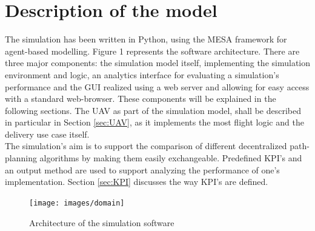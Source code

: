 \section{Description of the model}\label{sec:model}
The simulation has been written in Python, using the MESA \cite{masad.2015} framework for agent-based modelling. Figure 1 represents the software architecture. There are three major components: the simulation model itself, implementing the simulation environment and logic, an analytics interface for evaluating a simulation's performance and the GUI realized using a web server and allowing for easy access with a standard web-browser. These components will be explained in the following sections. The UAV as part of the simulation model, shall be described in particular in Section \ref{sec:UAV}, as it implements the most flight logic and the delivery use case itself.\\
The simulation's aim is to support the comparison of different decentralized path-planning algorithms by making them easily exchangeable. Predefined KPI's and an output method are used to support analyzing the performance of one's implementation. Section \ref{sec:KPI} discusses the way KPI's are defined.\\
\begin{figure}[tbp]\label{fig:architecture}
	\centering
	\texttt{[image: images/domain]} 
	\caption{Architecture of the simulation software}
\end{figure}


